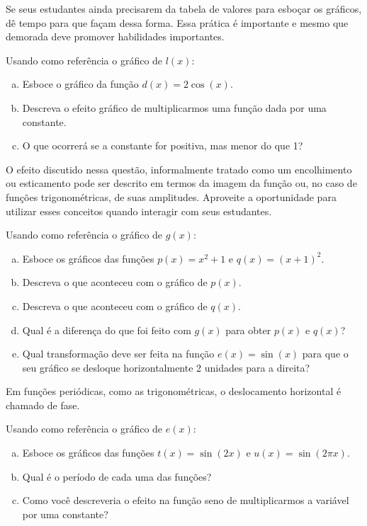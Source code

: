\documentclass[main_estudante.tex]{subfiles}
\begin{document}
Se seus estudantes ainda precisarem da tabela de valores para esboçar os gráficos, dê tempo para que façam dessa forma. Essa prática é importante e mesmo que demorada deve promover habilidades importantes.

\begin{questao}
Usando como referência o gráfico de $l(x)$:
\begin{enumerate}[a)]
\item Esboce o gráfico da função $d(x)=2\cos(x)$.
\item Descreva o efeito gráfico de multiplicarmos uma função dada por uma constante.
\item O que ocorrerá se a constante for positiva, mas menor do que 1?
\end{enumerate}
\end{questao}

O efeito discutido nessa questão, informalmente tratado como um encolhimento ou esticamento pode ser descrito em termos da imagem da função ou, no caso de funções trigonométricas, de suas amplitudes. Aproveite a oportunidade para utilizar esses conceitos quando interagir com seus estudantes.

\begin{questao}
Usando como referência o gráfico de  $g(x)$:
\begin{enumerate}[a)]
\item Esboce os gráficos das funções $p(x)=x^2+1$ e $q(x)=(x+1)^2$.
\item Descreva o que aconteceu com o gráfico de $p(x)$.
\item Descreva o que aconteceu com o gráfico de $q(x)$.
\item Qual é a diferença do que foi feito com $g(x)$ para obter $p(x)$ e $q(x)$?
\item Qual transformação deve ser feita na função $e(x)=\sin(x)$ para que o seu gráfico se desloque horizontalmente 2 unidades para a direita?
\end{enumerate}
\end{questao}

Em funções periódicas, como as trigonométricas, o deslocamento horizontal é chamado de fase.

\begin{questao}
Usando como referência o gráfico de $e(x)$:
\begin{enumerate}[a)]
\item Esboce os gráficos das funções $t(x)=\sin(2x)$ e $u(x)=\sin(2\pi x)$.
\item Qual é o período de cada uma das funções?
\item Como você descreveria o efeito na função seno de multiplicarmos a variável por uma constante?
\end{enumerate}
\end{questao}
\end{document}

